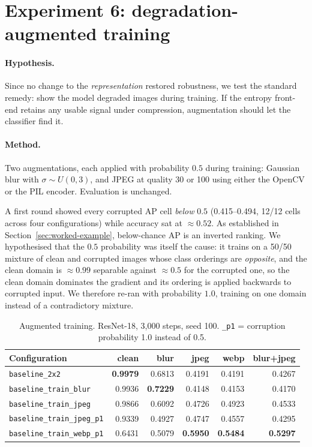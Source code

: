 \section{Experiment 6: degradation-augmented training}
\label{sec:exp-aug}

\paragraph{Hypothesis.} Since no change to the \emph{representation} restored
robustness, we test the standard remedy: show the model degraded images during
training. If the entropy front-end retains any usable signal under compression,
augmentation should let the classifier find it.

\paragraph{Method.} Two augmentations, each applied with probability $0.5$
during training: Gaussian blur with $\sigma \sim U(0,3)$, and JPEG at quality
30 or 100 using either the OpenCV or the PIL encoder. Evaluation is unchanged.

A first round showed every corrupted AP cell \emph{below} $0.5$ (0.415--0.494,
12/12 cells across four configurations) while accuracy sat at $\approx0.52$. As
established in Section~\ref{sec:worked-example}, below-chance AP is an inverted
ranking. We hypothesised that the $0.5$ probability was itself the cause: it
trains on a 50/50 mixture of clean and corrupted images whose class orderings
are \emph{opposite}, and the clean domain is $\approx0.99$ separable against
$\approx0.5$ for the corrupted one, so the clean domain dominates the gradient
and its ordering is applied backwards to corrupted input. We therefore re-ran
with probability $1.0$, training on one domain instead of a contradictory
mixture.

\begin{table}[t]
  \centering
  \caption{Augmented training. ResNet-18, 3{,}000 steps, seed 100.
  \texttt{\_p1} = corruption probability 1.0 instead of 0.5.}
  \label{tab:aug}
  \begin{tabular}{lrrrrr}
    \toprule
    Configuration & clean & blur & jpeg & webp & blur+jpeg \\
    \midrule
    \texttt{baseline\_2x2}             & \textbf{0.9979} & 0.6813 & 0.4191 & 0.4191 & 0.4267 \\
    \texttt{baseline\_train\_blur}     & 0.9936 & \textbf{0.7229} & 0.4148 & 0.4153 & 0.4170 \\
    \texttt{baseline\_train\_jpeg}     & 0.9866 & 0.6092 & 0.4726 & 0.4923 & 0.4533 \\
    \texttt{baseline\_train\_jpeg\_p1} & 0.9339 & 0.4927 & 0.4747 & 0.4557 & 0.4295 \\
    \texttt{baseline\_train\_webp\_p1} & 0.6431 & 0.5079 & \textbf{0.5950} & \textbf{0.5484} & \textbf{0.5297} \\
    \bottomrule
  \end{tabular}
\end{table}

